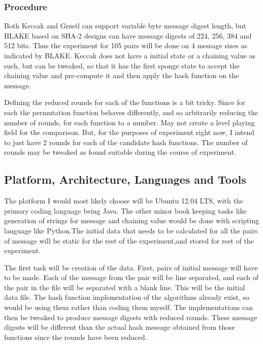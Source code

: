 \documentclass[12pt]{artikel3}                  %
\begin{document}
  \subsubsection{Procedure}

  Both Keccak and Gr{\o}stl can support variable byte message digest length, but BLAKE based on SHA-2 designs can have
  message digests of 224, 256, 384 and 512 bits. Thus the experiment for 105 pairs will be done on 4 message sizes as
  indicated by BLAKE. Keccak does not have a initial state or a chaining value as such, but can be tweaked, so that it
  has the first sponge state to accept the chaining value and pre-compute it and then apply the hash function on the
  message.

  Defining the reduced rounds for each of the functions is a bit tricky. Since for each the permutation function behaves
  differently, and so arbitrarily reducing the number of rounds, for each function to a number. May not create a level
  playing field for the comparison. But, for the purposes of experiment right now, I intend to just have 2 rounds for 
  each of the candidate hash functions. The number of rounds may be tweaked as found suitable during the course of 
  experiment.

\subsection{Platform, Architecture, Languages and Tools}
The platform I would most likely choose will be Ubuntu 12.04 LTS, with the primary coding language
being Java. The other minor book keeping tasks like generation of strings for message and chaining
value would be done with scripting language like Python.The initial data that needs to be calculated 
for all the pairs of message will be static for the rest of the experiment,and stored for rest of the
experiment.

The first task will be creation of the data. First, pairs of initial message will have to be 
made. Each of the message from the pair will be line separated, and each of the pair in the file
will be separated with a blank line. This will be the initial data file. The hash function 
implementation of the algorithms already exist, so would be using them rather than coding them 
myself. The implementations can then be tweaked to produce message digests with reduced rounds. 
These message digests will be different than the actual hash message obtained from those functions 
since the rounds have been reduced.
\end{document}
